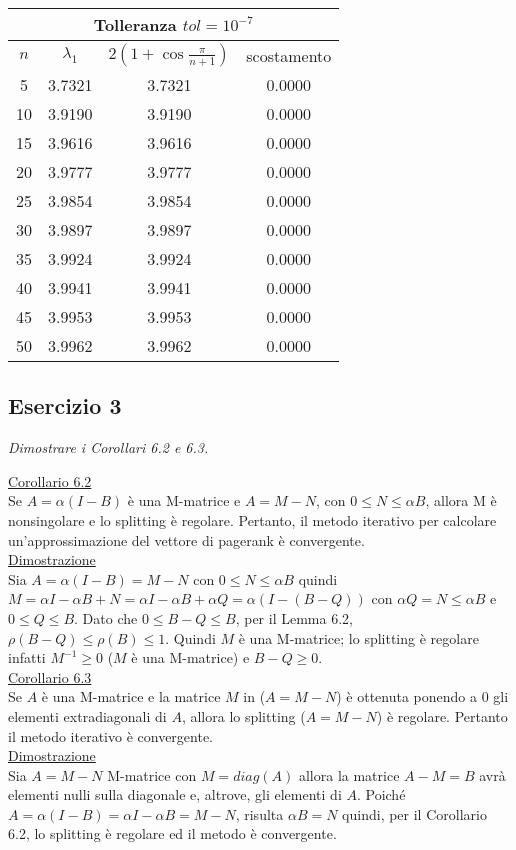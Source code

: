 \begin{sol}
  \begin{center}\begin{tabular}{c|c|c|c}
    \hline\multicolumn{4}{c}{Tolleranza $tol=10^{-7}$}\\\hline
    $n$ & $\lambda_1$ & $2\left(1+\cos{\frac{\pi}{n+1}}\right)$ & scostamento\\\hline
    5 & 3.7321 & 3.7321 & 0.0000 \\
    10 & 3.9190 & 3.9190 & 0.0000 \\
    15 & 3.9616 & 3.9616 & 0.0000 \\
    20 & 3.9777 & 3.9777 & 0.0000 \\
    25 & 3.9854 & 3.9854 & 0.0000 \\
    30 & 3.9897 & 3.9897 & 0.0000 \\
    35 & 3.9924 & 3.9924 & 0.0000 \\
    40 & 3.9941 & 3.9941 & 0.0000 \\
    45 & 3.9953 & 3.9953 & 0.0000 \\
    50 & 3.9962 & 3.9962 & 0.0000
  \end{tabular}\end{center}
\end{sol}

\subsection{Esercizio 3}
\label{sub:es3}
\emph{Dimostrare i Corollari 6.2 e 6.3.}
\begin{sol}
  \normalfont
  \underline{Corollario 6.2}\\
  Se $A=\alpha(I-B)$ è una M-matrice e $A=M-N$, con $0\leq N\leq\alpha B$, allora M è nonsingolare
  e lo splitting è regolare. Pertanto, il metodo iterativo per calcolare un’approssimazione
  del vettore di pagerank è convergente.
  \\
  \underline{Dimostrazione}\\
  Sia $A=\alpha(I-B)=M-N$ con $0\leq N\leq\alpha B$ quindi $M=\alpha I-\alpha B+N=\alpha I-\alpha B+\alpha Q=\alpha(I-(B-Q))$
  con $\alpha Q=N\leq\alpha B$ e $0\leq Q\leq B$. Dato che $0\leq B-Q\leq B$, per il Lemma 6.2,
  $\rho(B-Q)\leq\rho(B)\leq 1$. Quindi $M$ è una M-matrice; lo splitting è regolare infatti
  $M^{-1}\geq 0$ ($M$ è una M-matrice) e $B-Q\geq 0$.\\
  \vspace{5mm}
  \underline{Corollario 6.3}\\
  Se $A$ è una M-matrice e la matrice $M$ in ($A=M-N$) è ottenuta ponendo a $0$
  gli elementi extradiagonali di $A$, allora lo splitting ($A=M-N$) è regolare.
  Pertanto il metodo iterativo è convergente.\\
  \underline{Dimostrazione}\\
  Sia $A=M-N$ M-matrice con $M=diag(A)$ allora la matrice $A-M=B$ avrà elementi nulli sulla diagonale e, altrove,
  gli elementi di $A$. Poiché $A=\alpha(I-B)=\alpha I-\alpha B=M-N$, risulta $\alpha B=N$ quindi,
  per il Corollario 6.2, lo splitting è regolare ed il metodo è convergente.
\end{sol}

